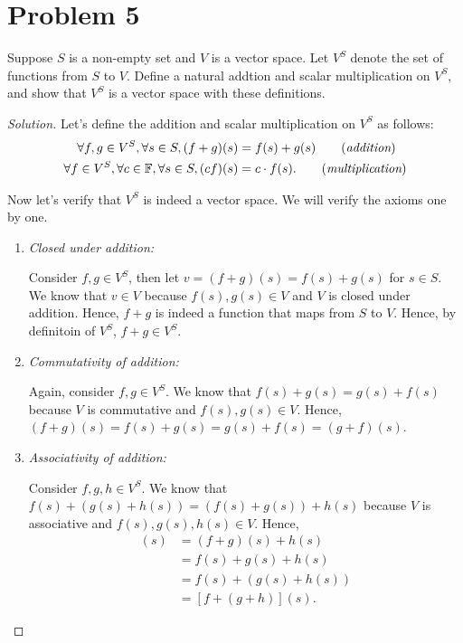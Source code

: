 \documentclass{article}
\begin{document}
\section*{Problem 5}
Suppose $S$ is a non-empty set and $V$ is a vector space. Let $V^S$ denote the set of functions from 
$S$ to $V$. Define a natural addtion and scalar multiplication on $V^S$, and show that $V^S$ is a 
vector space with these definitions.
\begin{proof}[Solution]
    Let's define the addition and scalar multiplication on $V^S$ as follows:
    \begin{align*}
        \forall f, g \in V^S, \forall s \in S, (f + g)(s) & = f(s) + g(s) \qquad (\emph{addition})\\
        \forall f \in V^S, \forall c \in \mathbb{F}, \forall s \in S, (cf)(s) & = c \cdot f(s). 
        \qquad (\emph{multiplication})
    \end{align*}

    Now let's verify that $V^S$ is indeed a vector space. We will verify the axioms one by one.
    \begin{enumerate}
        \item \emph{Closed under addition:} 
        
        Consider $f, g \in V^S$, then let $v = (f + g)(s) = f(s) + g(s)$ for $s\in S$. We know that 
        $v \in V$ because $f(s), g(s) \in V$ and $V$ is closed under addition. Hence, $f + g$ is 
        indeed a function that maps from $S$ to $V$. Hence, by definitoin of $V^S$, $f + g \in V^S$.

        \item \emph{Commutativity of addition:}
        
        Again, consider $f, g \in V^S$. We know that $f(s) + g(s) = g(s) + f(s)$ because $V$ is 
        commutative and $f(s), g(s) \in V$. Hence, $(f + g)(s) = f(s) + g(s) = g(s) + f(s) = 
        (g + f)(s)$. 

        \item \emph{Associativity of addition:}
        
        Consider $f, g, h \in V^S$. We know that $f(s) + (g(s) + h(s)) = (f(s) + g(s)) + h(s)$
        because $V$ is associative and $f(s), g(s), h(s) \in V$. Hence,
        \begin{align*}
            [(f + g) + h](s) & = (f + g)(s) + h(s) \\
            & = f(s) + g(s) + h(s) \\
            & = f(s) + (g(s) + h(s)) \\
            & = [f + (g + h)](s).
        \end{align*}


\end{enumerate}
\end{proof}
\end{document}
